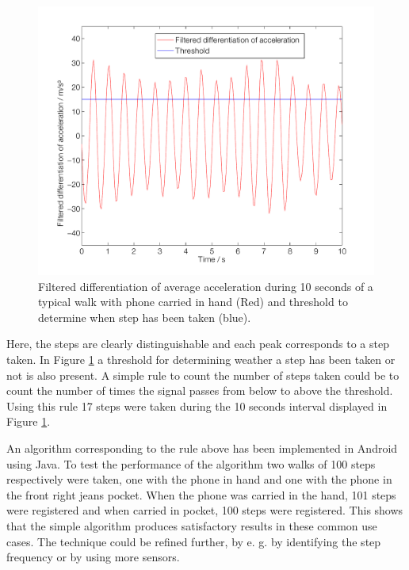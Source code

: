 \documentclass{LTHthesis}
\begin{document}
\begin{figure}[!hbt]

\includegraphics[width=1\textwidth ]{images/kinematic/avr_acc_dif_filt}
\caption{Filtered differentiation of average acceleration during 10 seconds of a typical walk with phone carried in hand (Red) and threshold to determine when step has been taken (blue). }\label{avr_acc_dif_filt}
\end{figure}

Here, the steps are clearly distinguishable and each peak corresponds to a step taken. In Figure \ref{avr_acc_dif_filt} a threshold for determining weather a step has been taken or not is also present. A simple rule to count the number of steps taken could be to count the number of times the signal passes from below to above the threshold. Using this rule 17 steps were taken during the 10 seconds interval displayed in Figure \ref{avr_acc_dif_filt}.

An algorithm corresponding to the rule above has been implemented in Android using Java. To test the performance of the algorithm two walks of 100 steps respectively were taken, one with the phone in hand and one with the phone in the front right jeans pocket. When the phone was carried in the hand, 101 steps were registered and when carried in pocket, 
100 steps were registered. This shows that the simple algorithm produces satisfactory results in these common use cases.
The technique could be refined further, by e. g. by identifying the step frequency or by using more sensors. 
%
\end{document}
